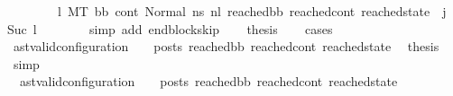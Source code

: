 \begin{isabellebody}
\ \ \ \ \ \ \ {\isacharparenleft}{\kern0pt}{\isasymexists}\ l{}{\isachardot}{\kern0pt}\ {\isacharparenleft}{\kern0pt}M{\isacharcomma}{\kern0pt}{\isasymLambda}{\isacharcomma}{\kern0pt}{\isasymGamma}{\isacharcomma}{\kern0pt}{\isasymOmega}{\isacharcomma}{\kern0pt}T\ {\isasymturnstile}{\isacharparenleft}{\kern0pt}bb{\isacharcomma}{\kern0pt}\ cont{}{\isacharcomma}{\kern0pt}\ Normal\ ns{}{\isacharprime}{\kern0pt}{\isacharprime}{\kern0pt}{\isacharparenright}{\kern0pt}\ {\isacharminus}{\kern0pt}n{\isasymlongrightarrow}{\isacharcircum}{\kern0pt}l{}\ {\isacharparenleft}{\kern0pt}reached{\isacharunderscore}{\kern0pt}bb{\isacharcomma}{\kern0pt}\ reached{\isacharunderscore}{\kern0pt}cont{\isacharcomma}{\kern0pt}\ reached{\isacharunderscore}{\kern0pt}state{\isacharparenright}{\kern0pt}{\isacharparenright}{\kern0pt}\ {\isasymand}\ {\isacharparenleft}{\kern0pt}j{\isacharprime}{\kern0pt}\ {\isacharequal}{\kern0pt}\ Suc\ l{}{\isacharparenright}{\kern0pt}\ {\isacharparenright}{\kern0pt}{\isachardoublequoteclose}\ \isanewline
\ \ \ \ \isamarkupfalse%
\ {\isacharparenleft}{\kern0pt}simp\ add{\isacharcolon}{\kern0pt}\ endblock{\isacharunderscore}{\kern0pt}skip{\isacharparenright}{\kern0pt}\isanewline
\ \ \isamarkupfalse%
\ {\isacharquery}{\kern0pt}thesis\isanewline
\ \ \isamarkupfalse%
\ cases\isanewline
\ \ \ \ \isamarkupfalse%
\ {\isachardoublequoteopen}{\isacharparenleft}{\kern0pt}ast{\isacharunderscore}{\kern0pt}valid{\isacharunderscore}{\kern0pt}configuration\ {\isasymLambda}\ {\isasymGamma}\ {\isasymOmega}\ posts\ reached{\isacharunderscore}{\kern0pt}bb\ reached{\isacharunderscore}{\kern0pt}cont\ reached{\isacharunderscore}{\kern0pt}state{\isacharparenright}{\kern0pt}{\isachardoublequoteclose}\ \isamarkupfalse%
\ {\isacharquery}{\kern0pt}thesis\ \isamarkupfalse%
\ simp\isanewline
\ \ \isamarkupfalse%
\ \isanewline
\ \ \ \ \isamarkupfalse%
\ {\isachardoublequoteopen}{\isasymnot}\ {\isacharparenleft}{\kern0pt}{\isacharparenleft}{\kern0pt}ast{\isacharunderscore}{\kern0pt}valid{\isacharunderscore}{\kern0pt}configuration\ {\isasymLambda}\ {\isasymGamma}\ {\isasymOmega}\ posts\ reached{\isacharunderscore}{\kern0pt}bb\ reached{\isacharunderscore}{\kern0pt}cont\ reached{\isacharunderscore}{\kern0pt}state{\isacharparenright}{\kern0pt}{\isacharparenright}{\kern0pt}{\isachardoublequoteclose}\isanewline
\ \ \ \ \isamarkupfalse%

\end{isabellebody}
